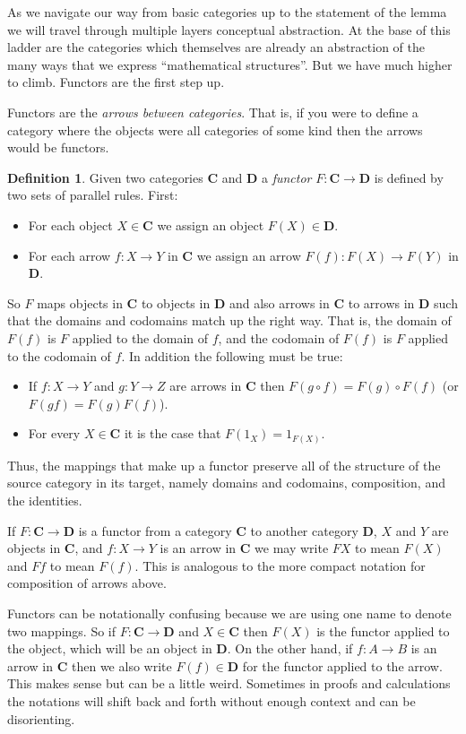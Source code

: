 \documentclass[12pt]{article}
\theoremstyle{definition}
\theoremstyle{definition}
\newtheorem{defn}{Definition}[]
\theoremstyle{definition}
\numberwithin{equation}{section}
\newcommand{\cat}[1]{\mathbf{#1}}      %
\newcommand{\CC}{\cat{C}}
\newcommand{\DD}{\cat{D}}
\def\ni{\goodbreak\noindent}
\begin{document}
As we navigate our way from basic categories up to the statement of the lemma we will
travel through multiple layers conceptual abstraction. At the base of this ladder
are the categories which themselves are already an abstraction of the many  ways
that we express ``mathematical structures''. But we have much higher to climb.
Functors are the first step up.

Functors are the {\it arrows between categories}. That is, if you were to define a
category where the objects were all categories of some kind then the arrows would be
functors.

\goodbreak
\begin{defn}
Given two categories $\CC$ and $\DD$ a {\it functor} $F : \CC \to \DD$ is defined by two
sets of parallel rules. First:
\begin{itemize}
\item For each object $X \in \CC$ we assign an object $F(X) \in \DD$.
\item For each arrow $f: X \to Y$ in $\CC$ we assign an arrow $F(f): F(X) \to F(Y)$ in
$\DD$.
\end{itemize}
\ni
So $F$ maps objects in $\CC$ to objects in $\DD$ and also arrows in $\CC$ to arrows in
$\DD$ such that the domains and codomains match up the right way. That is, the domain of
$F(f)$ is $F$ applied to the domain of $f$, and the codomain of $F(f)$ is $F$ applied to
the codomain of $f$. In addition the following must be true:
\begin{itemize}
\item If $f:X \to Y$ and $g: Y \to Z$ are arrows in $\CC$ then $F(g \circ f) = F(g) \circ
F(f)$ (or $F(gf) = F(g)F(f)$).
\item For every $X \in \CC$ it is the case that $F(1_X) = 1_{F(X)}$.
\end{itemize}

\end{defn}
\ni
Thus, the mappings that make up a functor preserve all of the structure of the source category
in its target, namely domains and codomains, composition, and the identities.

If $F: \CC \to \DD$ is a functor from a category $\CC$ to another category $\DD$,
$X$ and $Y$ are objects in $\CC$, and $f: X \to Y$ is an arrow in $\CC$ we may write 
$F X$ to mean $F(X)$ and $Ff$ to mean $F(f)$.
This is analogous to the more compact notation for composition of arrows above.

Functors can be notationally confusing because we are using one name to denote two
mappings. So if $F: \CC \to \DD$ and $X \in \CC$ then $F(X)$ is the functor applied to the
object, which will be an object in $\DD$. On the other hand, if $f : A \to B$ is an arrow
in $\CC$ then we also write $F(f) \in \DD$ for the functor applied to the arrow. This makes
sense but can be a little weird. Sometimes in proofs and calculations the notations will 
shift back and forth without enough context and can be disorienting.
\end{document}
